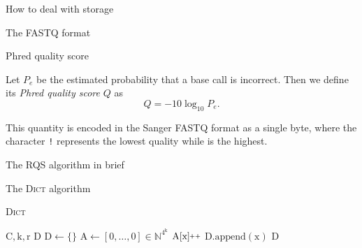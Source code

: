 \documentclass[12pt]{beamer}
\newcommand{\textapprox}{\raisebox{0.5ex}{\texttildelow}}
\newcommand{\pp}{\nolinebreak\hspace{-.05em}\raisebox{.4ex}{\tiny\bf +}\nolinebreak\raisebox{.4ex}{\tiny\bf +}\xspace}
\begin{document}
    \begin{frame}{How to deal with storage}
    \end{frame}

    \begin{frame}{The FASTQ format}
    \end{frame}

    \begin{frame}{Phred quality score}
        \begin{definition}
            Let \(P_e\) be the estimated probability that a base call is
            incorrect. Then we define its \emph{Phred quality score} \(Q\) as
            \[
                Q = -10\log_{10}{P_e}\text{.}
            \]
        \end{definition}
        \vspace{0.5cm}
        This quantity is encoded in the Sanger FASTQ format as a single byte,
        where the character \texttt{\textquotesingle!\textquotesingle}
        represents the lowest quality while
        \texttt{\textquotesingle\textapprox\textquotesingle} is the highest.
    \end{frame}

    \begin{frame}{The RQS algorithm in brief}
    \end{frame}

    \begin{frame}{The \textsc{Dict} algorithm}
        \begin{algorithm}[H]
            \caption{\textsc{Dict}}
            \begin{algorithmic}[1]
                \REQUIRE \(\text{C}, \text{k}, \text{r}\)
                \ENSURE \(\text{D}\)
                \STATE \(\text{D} \leftarrow \{\}\)
                \STATE \(\text{A} \leftarrow [0,\dots,0] \in \mathbb{N}^{4^\text{k}}\)
                    \STATE \(\text{A}[\text{x}]\pp\)
                \ENDFOR
                        \STATE \(\text{D}.\text{append}(\text{x})\)
                    \ENDIF
                \ENDFOR
                \RETURN \(\text{D}\)
            \end{algorithmic}
        \end{algorithm}
    \end{frame}
\end{document}
